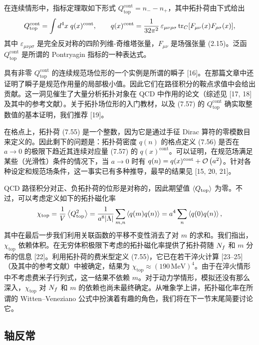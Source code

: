 在连续情形中，指标定理取如下形式 $Q^{\mathrm{cont}}_{\mathrm{top}} = n_- - n_+$，其中拓扑荷由下式给出
\begin{equation}
  Q^{\mathrm{cont}}_{\mathrm{top}} = \int d^4x\;q(x)^{\mathrm{cont}}, \qquad
  q(x)^{\mathrm{cont}} = \frac{1}{32\pi^2}\,\varepsilon_{\mu\nu\rho\sigma}
  \operatorname{tr}_C[F_{\mu\nu}(x)F_{\rho\sigma}(x)],
\end{equation}
其中 $\varepsilon_{\mu\nu\rho\sigma}$ 是完全反对称的四阶列维-奇维塔张量，$F_{\mu\nu}$ 是场强张量 (2.15)。泛函 $Q^{\mathrm{cont}}_{\mathrm{top}}$ 是所谓的 Pontryagin 指标的一种表达式。

具有非零 $Q^{\mathrm{cont}}_{\mathrm{top}}$ 的连续规范场位形的一个实例是所谓的瞬子 [16]。在那篇文章中还证明了瞬子是规范作用量的局部极小值。因此它们在路径积分的鞍点求值中会给出贡献。这一洞见催生了大量分析拓扑对象在 QCD 中作用的论文（综述见 [17, 18] 及其中的参考文献）。关于拓扑场位形的入门教材，以及 (7.57) 的 $Q^{\mathrm{cont}}_{\mathrm{top}}$ 确实取整数值的基本证明，我们推荐 [19]。

在格点上，拓扑荷 (7.55) 是一个整数，因为它是通过手征 Dirac 算符的零模数目来定义的。因此剩下的问题是：拓扑荷密度 $q(n)$ 的格点定义 (7.56) 是否在 $a \to 0$ 的极限下趋近其连续对应量 (7.57) 的 $q(x)^{\mathrm{cont}}$。可以证明，在规范场满足某些（光滑性）条件的情况下，当 $a \to 0$ 时有 $q(n) = q(x)^{\mathrm{cont}} + \mathcal{O}\left(a^2\right)$。针对各种设定和规范场条件，这一事实已有多种推导，最早的结果见 [15, 20, 21]。

QCD 路径积分对正、负拓扑荷的位形是对称的，因此期望值 $\left\langle Q_{\mathrm{top}} \right\rangle$ 为零。不过，可以考虑定义如下的拓扑磁化率
\begin{equation}
  \chi_{\mathrm{top}} = \frac{1}{V}\left\langle Q_{\mathrm{top}}^2 \right\rangle
  = \frac{1}{a^8|\Lambda|}\sum_{m,n}\left\langle q(m)q(n) \right\rangle
  = a^4\sum_n \left\langle q(0)q(n) \right\rangle,
\end{equation}
其中在最后一步我们利用关联函数的平移不变性消去了对 $m$ 的求和。我们指出，$\chi_{\mathrm{top}}$ 依赖体积。在无穷体积极限下考虑的拓扑磁化率提供了拓扑荷随 $N_f$ 和 $m$ 分布的信息 [22]。利用拓扑荷的费米型定义 (7.55)，它已在若干淬火计算 [23--25]（及其中的参考文献）中被确定，结果为 $\chi_{\mathrm{top}} \approx (190\,\mathrm{MeV})^4$。由于在淬火情形中不考虑费米子行列式，这一结果不依赖 $m$。对于动力学情形，模拟还没有那么深入，$\chi_{\mathrm{top}}$ 对 $N_f$ 和 $m$ 的依赖也尚未最终确定。从唯象学上讲，拓扑磁化率在所谓的 Witten--Veneziano 公式中扮演着有趣的角色，我们将在下一节末尾简要讨论它。

\subsection{轴反常}

